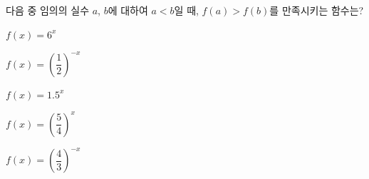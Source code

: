 다음 중 임의의 실수 $a$, $b$에 대하여 $a<b$일 때, $f(a)>f(b)$를 만족시키는 함수는?
\begin{choicesii}{\rule[-3ex]{0pt}{8ex}$f(x)=6^{x}$}{\rule[-3ex]{0pt}{8ex}$f(x)=\left(\dfrac{1}{2}\right)^{-x}$}{\rule[-3ex]{0pt}{8ex}$f(x)=1.5^{x}$}{\rule[-3ex]{0pt}{8ex}$f(x)=\left(\dfrac{5}{4}\right)^{x}$}{\rule[-3ex]{0pt}{8ex}$f(x)=\left(\dfrac{4}{3}\right)^{-x}$}\end{choicesii}
